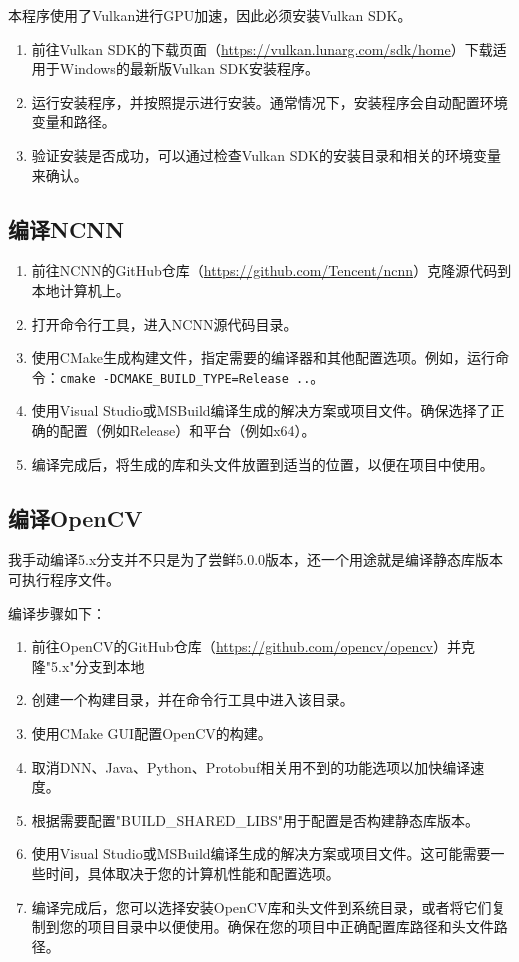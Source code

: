 本程序使用了Vulkan进行GPU加速，因此必须安装Vulkan SDK。

\begin{enumerate}
	\item 前往Vulkan SDK的下载页面（\url{https://vulkan.lunarg.com/sdk/home}）下载适用于Windows的最新版Vulkan SDK安装程序。
	\item 运行安装程序，并按照提示进行安装。通常情况下，安装程序会自动配置环境变量和路径。
	\item 验证安装是否成功，可以通过检查Vulkan SDK的安装目录和相关的环境变量来确认。
\end{enumerate}

\subsection{编译NCNN}

\begin{enumerate}
	\item 前往NCNN的GitHub仓库（\url{https://github.com/Tencent/ncnn}）克隆源代码到本地计算机上。
	\item 打开命令行工具，进入NCNN源代码目录。
	\item 使用CMake生成构建文件，指定需要的编译器和其他配置选项。例如，运行命令：\texttt{cmake -DCMAKE\_BUILD\_TYPE=Release ..}。
	\item 使用Visual Studio或MSBuild编译生成的解决方案或项目文件。确保选择了正确的配置（例如Release）和平台（例如x64）。
	\item 编译完成后，将生成的库和头文件放置到适当的位置，以便在项目中使用。
\end{enumerate}

\subsection{编译OpenCV}

我手动编译5.x分支并不只是为了尝鲜5.0.0版本，还一个用途就是编译静态库版本可执行程序文件。

编译步骤如下：

\begin{enumerate}
	\item 前往OpenCV的GitHub仓库（\url{https://github.com/opencv/opencv}）并克隆"5.x"分支到本地
	\item 创建一个构建目录，并在命令行工具中进入该目录。
	\item 使用CMake GUI配置OpenCV的构建。
	\item 取消DNN、Java、Python、Protobuf相关用不到的功能选项以加快编译速度。
	\item 根据需要配置"BUILD\_SHARED\_LIBS"用于配置是否构建静态库版本。
	\item 使用Visual Studio或MSBuild编译生成的解决方案或项目文件。这可能需要一些时间，具体取决于您的计算机性能和配置选项。
	\item 编译完成后，您可以选择安装OpenCV库和头文件到系统目录，或者将它们复制到您的项目目录中以便使用。确保在您的项目中正确配置库路径和头文件路径。
\end{enumerate}

